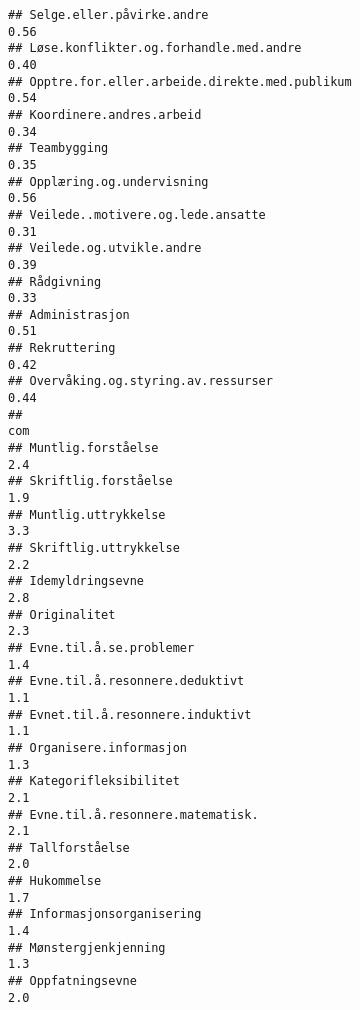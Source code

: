 \documentclass[
]{article}
\begin{document}
\begin{verbatim}
## Selge.eller.påvirke.andre                                                        0.56
## Løse.konflikter.og.forhandle.med.andre                                           0.40
## Opptre.for.eller.arbeide.direkte.med.publikum                                    0.54
## Koordinere.andres.arbeid                                                         0.34
## Teambygging                                                                      0.35
## Opplæring.og.undervisning                                                        0.56
## Veilede..motivere.og.lede.ansatte                                                0.31
## Veilede.og.utvikle.andre                                                         0.39
## Rådgivning                                                                       0.33
## Administrasjon                                                                   0.51
## Rekruttering                                                                     0.42
## Overvåking.og.styring.av.ressurser                                               0.44
##                                                                                  com
## Muntlig.forståelse                                                               2.4
## Skriftlig.forståelse                                                             1.9
## Muntlig.uttrykkelse                                                              3.3
## Skriftlig.uttrykkelse                                                            2.2
## Idemyldringsevne                                                                 2.8
## Originalitet                                                                     2.3
## Evne.til.å.se.problemer                                                          1.4
## Evne.til.å.resonnere.deduktivt                                                   1.1
## Evnet.til.å.resonnere.induktivt                                                  1.1
## Organisere.informasjon                                                           1.3
## Kategorifleksibilitet                                                            2.1
## Evne.til.å.resonnere.matematisk.                                                 2.1
## Tallforståelse                                                                   2.0
## Hukommelse                                                                       1.7
## Informasjonsorganisering                                                         1.4
## Mønstergjenkjenning                                                              1.3
## Oppfatningsevne                                                                  2.0

\end{verbatim}
\end{document}
